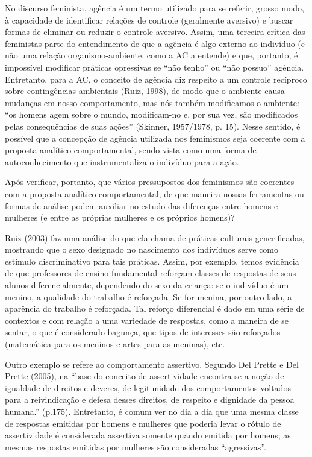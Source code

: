 No discurso feminista, agência é um termo utilizado para se referir, grosso modo, à capacidade de identificar relações de controle (geralmente aversivo) e buscar formas de eliminar ou reduzir o controle aversivo. Assim, uma terceira crítica das feministas parte do entendimento de que a agência é algo externo ao indivíduo (e não uma relação organismo-ambiente, como a AC a entende) e que, portanto, é impossível modificar práticas opressivas se ``não tenho'' ou ``não possuo'' agência. Entretanto, para a AC, o conceito de agência diz respeito a um controle recíproco sobre contingências ambientais (Ruiz, 1998), de modo que o ambiente causa mudanças em nosso comportamento, mas nós também modificamos o ambiente: ``os homens agem sobre o mundo, modificam-no e, por sua vez, são modificados pelas consequências de suas ações'' (Skinner, 1957/1978, p. 15). Nesse sentido, é possível que a concepção de agência utilizada nos feminismos seja coerente com a proposta analítico-comportamental, sendo vista como uma forma de autoconhecimento que instrumentaliza o indivíduo para a ação.

Após verificar, portanto, que vários pressupostos dos feminismos são coerentes com a proposta analítico-comportamental, de que maneira nossas ferramentas ou formas de análise podem auxiliar no estudo das diferenças entre homens e mulheres (e entre as próprias mulheres e os próprios homens)?

Ruiz (2003) faz uma análise do que ela chama de práticas culturais generificadas, mostrando que o sexo designado no nascimento dos indivíduos serve como estímulo discriminativo para tais práticas. Assim, por exemplo, temos evidência de que professores de ensino fundamental reforçam classes de respostas de seus alunos diferencialmente, dependendo do sexo da criança: se o indivíduo é um menino, a qualidade do trabalho é reforçada. Se for menina, por outro lado, a aparência do trabalho é reforçada. Tal reforço diferencial é dado em uma série de contextos e com relação a uma variedade de respostas, como a maneira de se sentar, o que é considerado bagunça, que tipos de interesses são reforçados (matemática para os meninos e artes para as meninas), etc. 

Outro exemplo se refere ao comportamento assertivo. Segundo Del Prette e Del Prette (2005), na ``base do conceito de assertividade encontra-se a noção de igualdade de direitos e deveres, de legitimidade dos comportamentos voltados para a reivindicação e defesa desses direitos, de respeito e dignidade da pessoa humana.'' (p.175). Entretanto, é comum ver no dia a dia que uma mesma classe de respostas emitidas por homens e mulheres que poderia levar o rótulo de assertividade é considerada assertiva somente quando emitida por homens; as mesmas respostas emitidas por mulheres são consideradas ``agressivas''.

